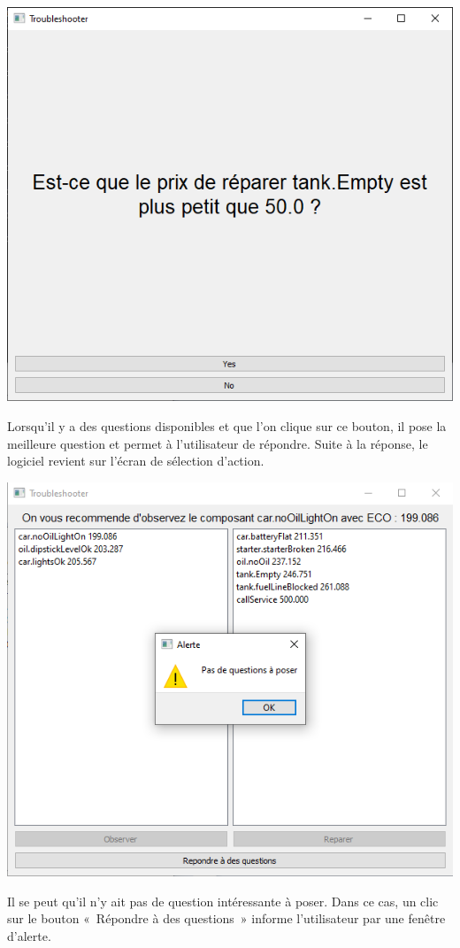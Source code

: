 \documentclass[a4paper,11pt]{article}
\theoremstyle{plain}
\theoremstyle{definition}
\begin{document}
\begin{center}
\includegraphics[scale=0.667]{Figures/elicitacao2}
\end{center}
Lorsqu'il y a des questions disponibles et que l'on clique sur ce bouton, il pose la meilleure question et permet à l'utilisateur de répondre. Suite à la réponse, le logiciel revient sur l'écran de sélection d'action. 

\begin{center}
\includegraphics[scale=0.667]{Figures/elicitacao_sem_questoes}
\end{center}
Il se peut qu'il n'y ait pas de question intéressante à poser. Dans ce cas, un clic sur le bouton «~Répondre à des questions~» informe l'utilisateur par une fenêtre d'alerte.
\end{document}
